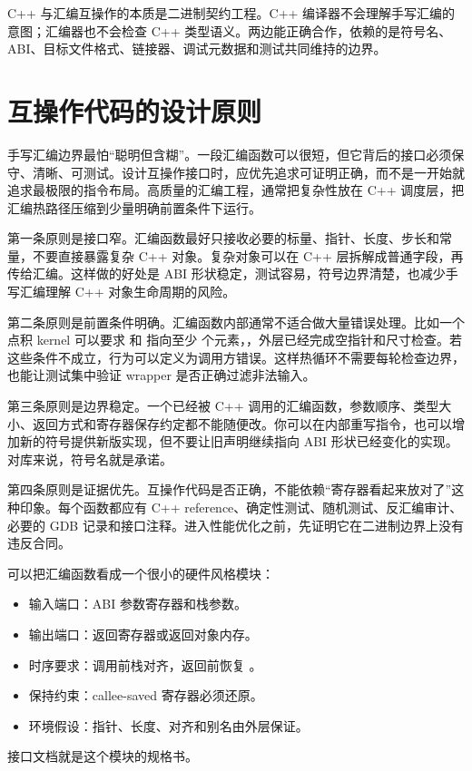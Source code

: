 \begin{keyidea}
C++ 与汇编互操作的本质是二进制契约工程。C++ 编译器不会理解手写汇编的意图；汇编器也不会检查 C++ 类型语义。两边能正确合作，依赖的是符号名、ABI、目标文件格式、链接器、调试元数据和测试共同维持的边界。
\end{keyidea}

\section{互操作代码的设计原则}

手写汇编边界最怕“聪明但含糊”。一段汇编函数可以很短，但它背后的接口必须保守、清晰、可测试。设计互操作接口时，应优先追求可证明正确，而不是一开始就追求最极限的指令布局。高质量的汇编工程，通常把复杂性放在 C++ 调度层，把汇编热路径压缩到少量明确前置条件下运行。

第一条原则是接口窄。汇编函数最好只接收必要的标量、指针、长度、步长和常量，不要直接暴露复杂 C++ 对象。复杂对象可以在 C++ 层拆解成普通字段，再传给汇编。这样做的好处是 ABI 形状稳定，测试容易，符号边界清楚，也减少手写汇编理解 C++ 对象生命周期的风险。

第二条原则是前置条件明确。汇编函数内部通常不适合做大量错误处理。比如一个点积 kernel 可以要求  和  指向至少  个元素，，外层已经完成空指针和尺寸检查。若这些条件不成立，行为可以定义为调用方错误。这样热循环不需要每轮检查边界，也能让测试集中验证 wrapper 是否正确过滤非法输入。

第三条原则是边界稳定。一个已经被 C++ 调用的汇编函数，参数顺序、类型大小、返回方式和寄存器保存约定都不能随便改。你可以在内部重写指令，也可以增加新的符号提供新版实现，但不要让旧声明继续指向 ABI 形状已经变化的实现。对库来说，符号名就是承诺。

第四条原则是证据优先。互操作代码是否正确，不能依赖“寄存器看起来放对了”这种印象。每个函数都应有 C++ reference、确定性测试、随机测试、反汇编审计、必要的 GDB 记录和接口注释。进入性能优化之前，先证明它在二进制边界上没有违反合同。

\begin{mentalmodel}
可以把汇编函数看成一个很小的硬件风格模块：

\begin{itemize}
  \item 输入端口：ABI 参数寄存器和栈参数。
  \item 输出端口：返回寄存器或返回对象内存。
  \item 时序要求：调用前栈对齐，返回前恢复 。
  \item 保持约束：callee-saved 寄存器必须还原。
  \item 环境假设：指针、长度、对齐和别名由外层保证。
\end{itemize}

接口文档就是这个模块的规格书。
\end{mentalmodel}

